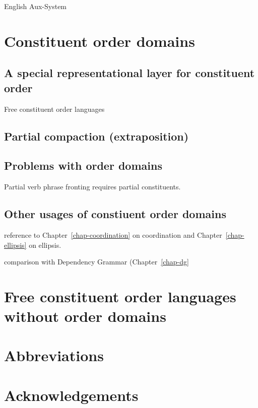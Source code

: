 \documentclass[output=paper]{langsci/langscibook}
\begin{document}
English Aux-System \citep{Fillmore99a,Sag2018a}

\section{Constituent order domains}

\subsection{A special representational layer for constituent order}

\citet{Reape94a,Kathol2001a,Mueller2004b}

Free constituent order languages \citet{DS99a}

\subsection{Partial compaction (extraposition)}

\subsection{Problems with order domains}

Partial verb phrase fronting requires partial constituents.

\citep{Kathol2001a,MuellerGS}

\subsection{Other usages of constiuent order domains}

reference to Chapter~\ref{chap-coordination} on coordination and Chapter~\ref{chap-ellipsis} on ellipsis.

comparison with Dependency Grammar (Chapter~\ref{chap-dg}

\section{Free constituent order languages without order domains}

\citet{Bender2008a}


 
\section*{Abbreviations}
\section*{Acknowledgements}

\printbibliography[heading=subbibliography,notkeyword=this] 
\end{document}
